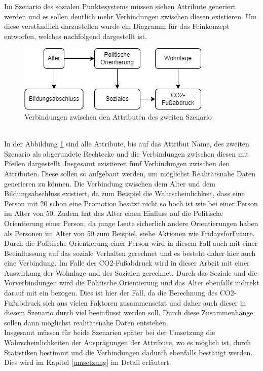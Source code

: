 \begin{onehalfspace}
Im Szenario des sozialen Punktesystems müssen sieben Attribute generiert werden und es sollen deutlich mehr Verbindungen zwischen diesen existieren. Um diese verständlich darzustellen wurde ein Diagramm für das Feinkonzept entworfen, welches nachfolgend dargestellt ist.\\
\begin{figure}[h]
    \centering
    \includegraphics{Diagramme/Verbindung_der_Attribute_S2.jpg}
    \caption{Verbindungen zwischen den Attributen des zweiten Szenario}
    \label{fig:VerbindungenS2}
\end{figure}\\
In der Abbildung \ref{fig:VerbindungenS2} sind alle Attribute, bis auf das Attribut Name, des zweiten Szenario als abgerundete Rechtecke und die Verbindungen zwischen diesen mit Pfeilen dargestellt. Insgesamt existieren fünf Verbindungen zwischen den Attributen. Diese sollen so aufgebaut werden, um möglichst Realitätsnahe Daten generieren zu können. Die Verbindung zwischen dem Alter und dem Bildungsabschluss existiert, da zum Beispiel die Wahrscheinlichkeit, dass eine Person mit 20 schon eine Promotion besitzt nicht so hoch ist wie bei einer Person im Alter von 50. Zudem hat das Alter einen Einfluss auf die Politische Orientierung einer Person, da junge Leute sicherlich andere Orientierungen haben als Personen im Alter von 50 zum Beispiel, siehe Aktionen wie \glqq{}FridaysforFuture\grqq{}. Durch die Politische Orientierung einer Person wird in diesem Fall auch mit einer Beeinflussung auf das soziale Verhalten gerechnet und es besteht daher hier auch eine Verbindung. Im Falle des CO2-Fußabdruck wird in dieser Arbeit mit einer Auswirkung der Wohnlage und des Sozialen gerechnet. Durch das Soziale und die Vorverbindungen wird die Politische Orientierung und das Alter ebenfalls indirekt darauf mit ein bezogen. Dies ist hier der Fall, da die Berechnung des CO2-Fußabdruck sich aus vielen Faktoren zusammensetzt und daher auch dieser in diesem Szenario durch viel beeinflusst werden soll. Durch diese Zusammenhänge sollen dann möglichst realitätsnahe Daten entstehen.\\
Insgesamt müssen für beide Szenarien später bei der Umsetzung die Wahrscheinlichkeiten der Ausprägungen der Attribute, wo es möglich ist, durch Statistiken bestimmt und die Verbindungen dadurch ebenfalls bestätigt werden. Dies wird im Kapitel \ref{umsetzung} im Detail erläutert.\\

\end{onehalfspace}
